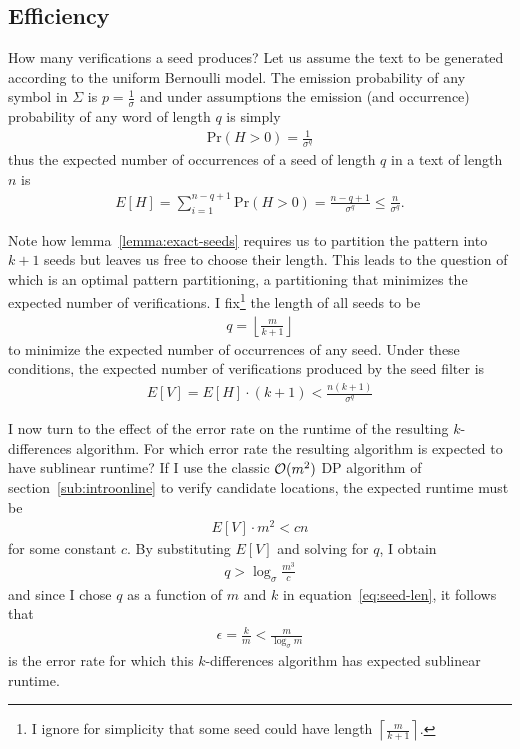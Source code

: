 \subsection{Efficiency}

How many verifications a seed produces?
Let us assume the text to be generated according to the uniform Bernoulli model.
The emission probability of any symbol in $\Sigma$ is $p = \frac{1}{\sigma}$ and under \iid assumptions the emission (and occurrence) probability of any word of length $q$ is simply
\begin{eqnarray}
\text{Pr}(H > 0) = \frac{1}{\sigma^q}
\end{eqnarray}
thus the expected number of occurrences of a seed of length $q$ in a text of length $n$ is
\begin{eqnarray}
E[H] = \sum_{i=1}^{n-q+1}{\text{Pr}(H > 0)} = \frac{n - q + 1}{\sigma^q} \leq \frac{n}{\sigma^q}.
\end{eqnarray}

Note how lemma~\ref{lemma:exact-seeds} requires us to partition the pattern into $k+1$ seeds but leaves us free to choose their length.
This leads to the question of which is an optimal pattern partitioning, \ie a partitioning that minimizes the expected number of verifications.
I fix\footnote{I ignore for simplicity that some seed could have length $\left \lceil \frac{m}{k+1} \right \rceil$.} the length of all seeds to be
\begin{eqnarray}
\label{eq:seed-len}
q=\left \lfloor \frac{m}{k+1} \right \rfloor
\end{eqnarray}
to minimize the expected number of occurrences of any seed.
Under these conditions, the expected number of verifications produced by the seed filter is
\begin{eqnarray}
E[V] = E[H] \cdot (k + 1) < \frac{n (k + 1)}{\sigma^q}
\end{eqnarray}

I now turn to the effect of the error rate on the runtime of the resulting $k$-differences algorithm.
For which error rate the resulting algorithm is expected to have sublinear runtime?
If I use the classic $\mathcal{O}(m^2)$ DP algorithm of section~\ref{sub:introonline} to verify candidate locations, the expected runtime must be
\begin{eqnarray}
E[V] \cdot m^2 < cn
\end{eqnarray}
for some constant $c$.
By substituting $E[V]$ and solving for $q$, I obtain
\begin{eqnarray}
q > \log_{\sigma}{\frac{m^3}{c}}
\end{eqnarray}
and since I chose $q$ as a function of $m$ and $k$ in equation~\ref{eq:seed-len}, it follows that
\begin{eqnarray}
\epsilon = \frac{k}{m} < \frac{m}{\log_{\sigma}{m}}
\end{eqnarray}
is the error rate for which this $k$-differences algorithm has expected sublinear runtime.

